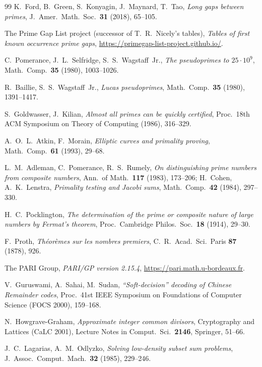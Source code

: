 \documentclass[11pt,oneside]{report}
\theoremstyle{plain}
\theoremstyle{definition}
\theoremstyle{remark}
\begin{document}
\begin{thebibliography}{99}
 K.~Ford, B.~Green, S.~Konyagin, J.~Maynard, T.~Tao,
\emph{Long gaps between primes}, J.\ Amer.\ Math.\ Soc.\ \textbf{31}
(2018), 65--105.

 The Prime Gap List project (successor of T.~R.~Nicely's
tables), \emph{Tables of first known occurrence prime gaps},
\url{https://primegap-list-project.github.io/}.

 C.~Pomerance, J.~L.~Selfridge, S.~S.~Wagstaff~Jr., \emph{The
pseudoprimes to $25\cdot10^9$}, Math.\ Comp.\ \textbf{35} (1980),
1003--1026.

 R.~Baillie, S.~S.~Wagstaff~Jr., \emph{Lucas pseudoprimes},
Math.\ Comp.\ \textbf{35} (1980), 1391--1417.

 S.~Goldwasser, J.~Kilian, \emph{Almost all
primes can be quickly certified}, Proc.\ 18th ACM Symposium on Theory of
Computing (1986), 316--329.

 A.~O.~L.~Atkin, F.~Morain, \emph{Elliptic curves
and primality proving}, Math.\ Comp.\ \textbf{61} (1993), 29--68.

 L.~M.~Adleman, C.~Pomerance, R.~S.~Rumely, \emph{On
distinguishing prime numbers from composite numbers}, Ann.\ of Math.\
\textbf{117} (1983), 173--206; H.~Cohen, A.~K.~Lenstra, \emph{Primality
testing and Jacobi sums}, Math.\ Comp.\ \textbf{42} (1984), 297--330.

 H.~C.~Pocklington, \emph{The determination of the
prime or composite nature of large numbers by Fermat's theorem}, Proc.\
Cambridge Philos.\ Soc.\ \textbf{18} (1914), 29--30.

 F.~Proth, \emph{Th\'eor\`emes sur les nombres premiers},
C.\ R.\ Acad.\ Sci.\ Paris \textbf{87} (1878), 926.

 The PARI Group, \emph{PARI/GP version 2.15.4},
\url{https://pari.math.u-bordeaux.fr}.

 V.~Guruswami, A.~Sahai, M.~Sudan, \emph{``Soft-decision''
decoding of Chinese Remainder codes}, Proc.\ 41st IEEE Symposium on
Foundations of Computer Science (FOCS 2000), 159--168.

 N.~Howgrave-Graham, \emph{Approximate integer common
divisors}, Cryptography and Lattices (CaLC 2001), Lecture Notes in
Comput.\ Sci.\ \textbf{2146}, Springer, 51--66.

 J.~C.~Lagarias, A.~M.~Odlyzko, \emph{Solving low-density
subset sum problems}, J.\ Assoc.\ Comput.\ Mach.\ \textbf{32} (1985),
229--246.


\end{thebibliography}
\end{document}
